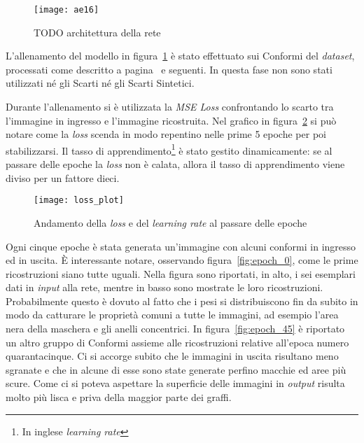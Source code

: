 \begin{figure}[ht]
  \begin{center}
    \texttt{[image: ae16]}
    \caption{TODO architettura della rete}
    \label{fig:ae16_arch}
  \end{center}
\end{figure}

\clearpage
L'allenamento del modello in figura~\ref{fig:ae16_arch} è stato effettuato sui Conformi del \textit{dataset}, processati come descritto a pagina~\pageref{prep} e seguenti.
In questa fase non sono stati utilizzati né gli Scarti né gli Scarti Sintetici.

Durante l'allenamento si è utilizzata la \textit{MSE Loss} confrontando lo scarto tra l'immagine in ingresso e l'immagine ricostruita.
Nel grafico in figura~\ref{fig:loss_plot} si può notare come la \textit{loss} scenda in modo repentino nelle prime 5 epoche per poi stabilizzarsi.
Il tasso di apprendimento\footnote{In inglese \textit{learning rate}} è stato gestito dinamicamente: se al passare delle epoche la \textit{loss} non è calata, allora il tasso di apprendimento viene diviso per un fattore dieci.

\begin{figure}[ht] %
  \begin{center}
    \texttt{[image: loss\_plot]}
    \caption{Andamento della \textit{loss} e del \textit{learning rate} al passare delle epoche}
    \label{fig:loss_plot}
  \end{center}
\end{figure}

Ogni cinque epoche è stata generata un'immagine con alcuni conformi in ingresso  ed in uscita.
È interessante notare, osservando figura~\ref{fig:epoch_0}, come le prime ricostruzioni siano tutte uguali.
Nella figura sono riportati, in alto, i sei esemplari dati in \textit{input} alla rete, mentre in basso sono mostrate le loro ricostruzioni.
Probabilmente questo è dovuto al fatto che i pesi si distribuiscono fin da subito in modo da catturare le proprietà comuni a tutte le immagini, ad esempio l'area nera della maschera e gli anelli concentrici.
In figura~\ref{fig:epoch_45} è riportato un altro gruppo di Conformi assieme alle ricostruzioni relative all'epoca numero quarantacinque.
Ci si accorge subito che le immagini in uscita risultano meno sgranate e che in alcune di esse sono state generate perfino macchie ed aree più scure.
Come ci si poteva aspettare la superficie delle immagini in \textit{output} risulta molto più lisca e priva della maggior parte dei graffi.

